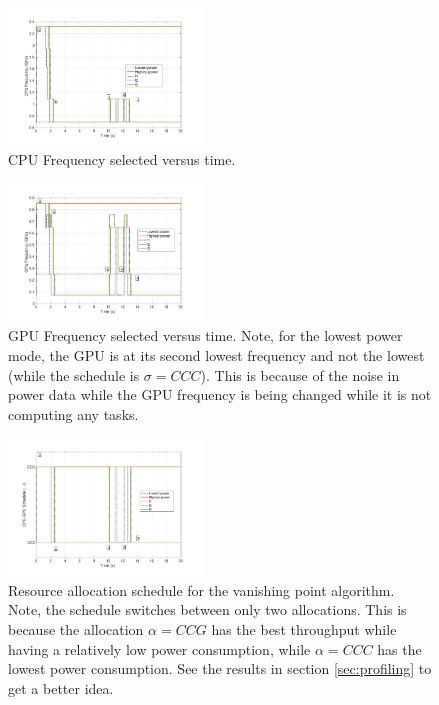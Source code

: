  
\begin{figure}[hbtp]
\centering
\includegraphics[width=0.46\textwidth]{../simulations/figs/CPUF.pdf}
\caption{CPU Frequency selected versus time.}
\label{fig:cpuf} 
\end{figure}


\begin{figure}[hbtp]
\centering
\includegraphics[width=0.46\textwidth]{../simulations/figs/GPUF.pdf}
\caption{GPU Frequency selected versus time. Note, for the lowest power mode, the GPU is at its second lowest frequency and not the lowest (while the schedule is $\sigma=CCC$). This is because of the noise in power data while the GPU frequency is being changed while it is not computing any tasks.}
\label{fig:gpuf} 
\end{figure}


\begin{figure}[hbtp]
\centering
\includegraphics[width=0.46\textwidth]{../simulations/figs/schedule.pdf}
\caption{Resource allocation schedule for the vanishing point algorithm. Note, the schedule switches between only two allocations. This is because the allocation $\alpha=CCG$ has the best throughput while having a relatively low power consumption, while $\alpha=CCC$ has the lowest power consumption. See the results in section \ref{sec:profiling} to get a better idea.}
\label{fig:schedule} 
\end{figure}

